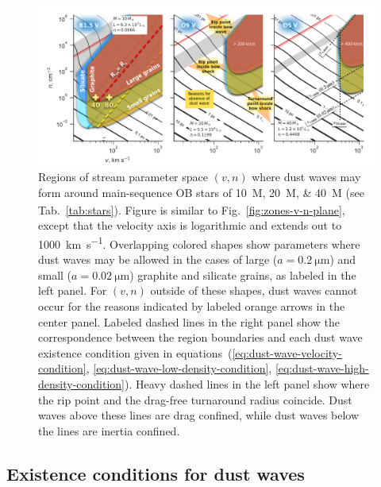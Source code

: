 \begin{figure}
  \centering
  \includegraphics[width=\linewidth]{figs/existence-dust-wave}
  \caption{Regions of stream parameter space \((v, n)\) where dust
    waves may form around main-sequence OB stars of
    \SIlist{10;20;40}{M_\odot} (see Tab.~\ref{tab:stars}).  Figure is
    similar to Fig.~\ref{fig:zones-v-n-plane}, except that the
    velocity axis is logarithmic and extends out to
    \SI{1000}{km.s^{-1}}.  Overlapping colored shapes show parameters
    where dust waves may be allowed in the cases of large
    (\(a = \SI{0.2}{\um}\)) and small (\(a = \SI{0.02}{\um}\))
    graphite and silicate grains, as labeled in the left panel.  For
    \((v, n)\) outside of these shapes, dust waves cannot occur for
    the reasons indicated by labeled orange arrows in the center
    panel.  Labeled dashed lines in the right panel show the
    correspondence between the region boundaries and each dust wave
    existence condition given in
    equations~(\ref{eq:dust-wave-velocity-condition},
    \ref{eq:dust-wave-low-density-condition},
    \ref{eq:dust-wave-high-density-condition}). Heavy dashed lines in
    the left panel show where the rip point and the drag-free
    turnaround radius coincide.  Dust waves above these lines are drag
    confined, while dust waves below the lines are inertia confined.
  }
  \label{fig:existence-dust-wave}
\end{figure}

\subsection{Existence conditions for dust waves}
\label{sec:exist-cond-separ}


